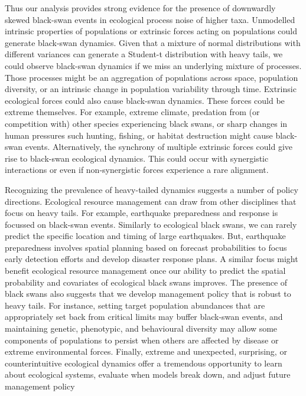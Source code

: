 Thus our analysis provides strong evidence for the presence of downwardly skewed black-swan events in ecological process noise of higher taxa. Unmodelled intrinsic properties of populations or extrinsic forces acting on populations could generate black-swan dynamics. Given that a mixture of normal distributions with different variances can generate a Student-t distribution with heavy tails\cite{allen2001}, we could observe black-swan dynamics if we miss an underlying mixture of processes. Those processes might be an aggregation of populations across space, population diversity\cite{anderson2015}, or an intrinsic change in population variability through time. Extrinsic ecological forces could also cause black-swan dynamics\cite{nunez2012}. These forces could be extreme themselves. For example, extreme climate, predation from (or competition with) other species experiencing black swans, or sharp changes in human pressures such hunting, fishing, or habitat destruction might cause black-swan events. Alternatively, the synchrony of multiple extrinsic forces could give rise to black-swan ecological dynamics. This could occur with synergistic interactions\cite{kirby2009} or even if non-synergistic forces experience a rare alignment\cite{denny2009}.

Recognizing the prevalence of heavy-tailed dynamics suggests a number of policy directions. Ecological resource management can draw from other disciplines that focus on heavy tails. For example, earthquake preparedness and response is focussed on black-swan events. Similarly to ecological black swans, we can rarely predict the specific location and timing of large earthquakes. But, earthquake preparedness involves spatial planning based on forecast probabilities to focus early detection efforts and develop disaster response plans\cite{nrc2007}. A similar focus might benefit ecological resource management once our ability to predict the spatial probability and covariates of ecological black swans improves. The presence of black swans also suggests that we develop management policy that is robust to heavy tails. For instance, setting target population abundances that are appropriately set back from critical limits may buffer black-swan events\cite{caddy1996}, and maintaining genetic, phenotypic, and behavioural diversity may allow some components of populations to persist when others are affected by disease or extreme environmental forces\cite{hilborn2003, schindler2010, anderson2015}. Finally, extreme and unexpected, surprising, or counterintuitive ecological dynamics offer a tremendous opportunity to learn about ecological systems, evaluate when models break down, and adjust future management policy\cite{doak2008, pine-iii2009, lindenmayer2010}

